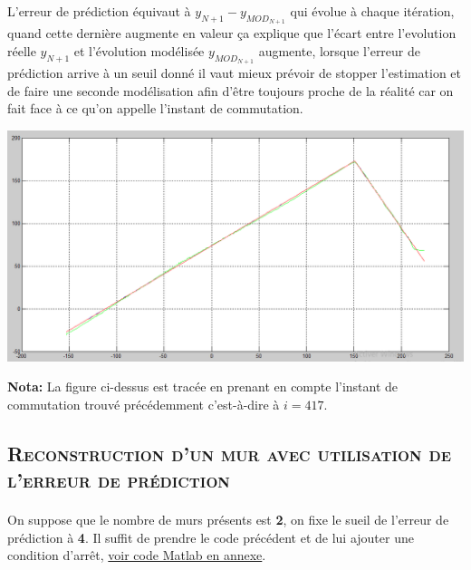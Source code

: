 	\par L'erreur de prédiction équivaut à $ y_{N+1} - y_{MOD_{N+1}} $ qui évolue à chaque itération, quand cette dernière augmente en valeur ça explique que l'écart entre l'evolution réelle $y_{N+1}$ et l'évolution modélisée $y_{MOD_{N+1}}$ augmente, lorsque l'erreur de prédiction arrive à un seuil donné il vaut mieux prévoir de stopper l'estimation et de faire une seconde modélisation afin d'être toujours proche de la réalité car on fait face à ce qu'on appelle l'instant de commutation.\\    

	\begin{center}
	\includegraphics[scale=0.5]{MCrecu.PNG}
	\label{fig4} 
	\end{center}
	
	\textbf{Nota:} La figure ci-dessus est tracée en prenant en compte l'instant de commutation trouvé précédemment c'est-à-dire à $i=417$.\\ 
	
\subsection{\textsc{ Reconstruction d'un mur avec utilisation de l'erreur de prédiction }}

	\paragraph{} On suppose que le nombre de murs présents est \textbf{2}, on fixe le sueil de l'erreur de prédiction à \textbf{4}. Il suffit de prendre le code précédent et de lui ajouter une condition d'arrêt, \label{section 1.3.2} \hyperref[Annexe C] {voir code Matlab en annexe}. \\
  

